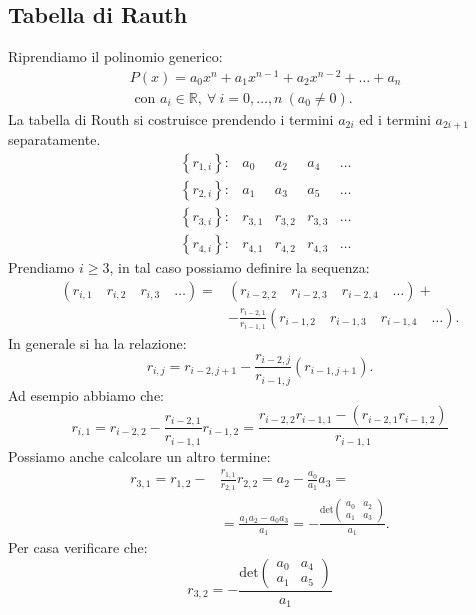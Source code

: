 \subsection{Tabella di Rauth}%
\label{sub:Tabella di Rauth}
Riprendiamo il polinomio generico:
\[\begin{aligned}
    &P(x) = a_0 x^{n}+ a_1x^{n-1} + a_2 x^{n-2}+ \ldots + a_{n} \\
    &\text{ con  } a_i \in \mathbb{R}, \ \forall  \ i = 0 , \ldots, n \ (a_0\neq 0)
.\end{aligned}\]
La tabella di Routh si costruisce prendendo i termini $a_{2i}$ ed i termini $a_{2i + 1}$ separatamente.
\[
    \begin{matrix}
	   & \left\{r_{1,i}\right\}: & a_0  & a_2  & a_4  &\ldots\\
	   & \left\{r_{2, i}\right\}:& a_1 & a_3  & a_5 & \ldots\\
	   & \left\{r_{3, i}\right\}: & r_{3, 1} & r_{3,2} & r_{3,3} & \ldots\\
	   & \left\{r_{4, i}\right\}: & r_{4, 1} & r_{4,2} & r_{4,3} & \ldots
    \end{matrix}
\] 
Prendiamo $i \ge 3$, in tal caso possiamo definire la sequenza:
\[\begin{aligned}
    \left(r_{i, 1} \quad r_{i, 2} \quad r_{i, 3} \quad \ldots\right) = &\left(r_{i-2, 2} \quad r_{i-2, 3} \quad r_{i-2, 4} \quad \ldots\right) + \\
    & - \frac{r_{i-2, 1}}{r_{i-1,1}}(r_{i-1,2} \quad r_{i-1,3} \quad r_{i-1,4} \quad \ldots)
.\end{aligned}\]
In generale si ha la relazione:
\[
    r_{i, j} = r_{i-2, j + 1} - \frac{r_{i-2, j}}{r_{i-1, j}}\left(r_{i-1, j + 1}\right)
.\] 
Ad esempio abbiamo che:
\[
    r_{i,1}= r_{i-2,2} - \frac{r_{i-2,1}}{r_{i-1,1}}r_{i-1,2} = 
    \frac{r_{i-2,2}r_{i-1,1}- (r_{i-2, 1}r_{i-1,2})}{r_{i-1,1}}
\] 
Possiamo anche calcolare un altro termine:
\[\begin{aligned}
     r_{3,1} = r_{1,2}- &\frac{r_{1,1}}{r_{2,1}}r_{2,2} = a_2 - \frac{a_0}{a_1} a_3 = \\
    &=\frac{ a_1a_2-a_0a_3}{a_1} = - \frac{\text{det}\begin{pmatrix} a_0 & a_2 \\ a_1 & a_3 \end{pmatrix} }{a_1}
.\end{aligned}\]
Per casa verificare che:
\[
    r_{3,2} = - \frac{\text{det}\begin{pmatrix} a_0 & a_4 \\ a_1 & a_5 \end{pmatrix} }{a_1}
\] 
